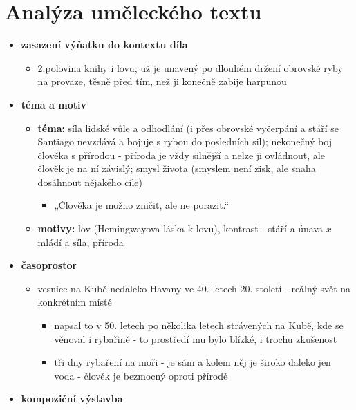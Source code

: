 \documentclass[11pt]{article}
\begin{document}
    \section*{Analýza uměleckého textu}
    \begin{itemize}
        \item\textbf{zasazení výňatku do kontextu díla}
        \begin{itemize}
            \item 2.polovina knihy i lovu, už je unavený po dlouhém držení obrovské ryby na provaze, těsně před tím, než ji konečně zabije harpunou
        \end{itemize}
        \item\textbf{téma a motiv}
        \begin{itemize}
            \item\textbf{téma: }síla lidské vůle a odhodlání (i přes obrovské vyčerpání a stáří se Santiago nevzdává a bojuje s rybou do posledních sil); nekonečný boj člověka s přírodou - příroda je vždy silnější a nelze ji ovládnout, ale člověk je na ní závislý; smysl života (smyslem není zisk, ale snaha dosáhnout nějakého cíle)
            \begin{itemize}
                \item „Člověka je možno zničit, ale ne porazit.“
            \end{itemize}
            \item\textbf{motivy: }lov (Hemingwayova láska k lovu), kontrast - stáří a únava $x$ mládí a síla, příroda
        \end{itemize}
        \item\textbf{časoprostor}
        \begin{itemize}
            \item vesnice na Kubě nedaleko Havany ve 40. letech 20. století - reálný svět na konkrétním místě
            \begin{itemize}
                \item napsal to v 50. letech po několika letech strávených na Kubě, kde se věnoval i rybařině - to prostředí mu bylo blízké, i trochu zkušenost
                \item tři dny rybaření na moři - je sám a kolem něj je široko daleko jen voda - člověk je bezmocný oproti přírodě
            \end{itemize}
        \end{itemize}
        \item\textbf{kompoziční výstavba}
        \begin{itemize}

\end{itemize}
\end{itemize}
\end{document}
